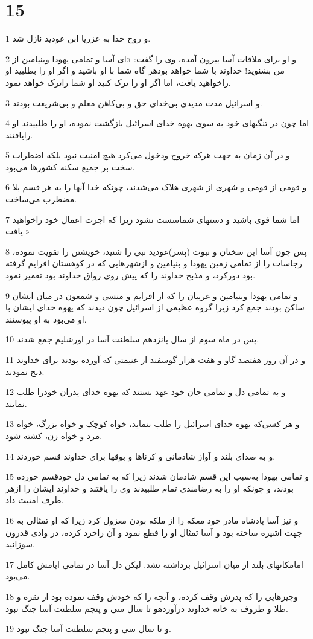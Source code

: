 \chapter{15}

\par 1 و روح خدا به عزریا ابن عودید نازل شد.
\par 2 و او برای ملاقات آسا بیرون آمده، وی را گفت: «ای آسا و تمامی یهودا وبنیامین از من بشنوید! خداوند با شما خواهد بودهر گاه شما با او باشید و اگر او را بطلبید او راخواهید یافت، اما اگر او را ترک کنید او شما راترک خواهد نمود.
\par 3 و اسرائیل مدت مدیدی بی‌خدای حق و بی‌کاهن معلم و بی‌شریعت بودند.
\par 4 اما چون در تنگیهای خود به سوی یهوه خدای اسرائیل بازگشت نموده، او را طلبیدند او رایافتند.
\par 5 و در آن زمان به جهت هر‌که خروج ودخول می‌کرد هیچ امنیت نبود بلکه اضطراب سخت بر جمیع سکنه کشورها می‌بود.
\par 6 و قومی از قومی و شهری از شهری هلاک می‌شدند، چونکه خدا آنها را به هر قسم بلا مضطرب می‌ساخت.
\par 7 اما شما قوی باشید و دستهای شماسست نشود زیرا که اجرت اعمال خود راخواهید یافت.»
\par 8 پس چون آسا این سخنان و نبوت (پسر)عودید نبی را شنید، خویشتن را تقویت نموده، رجاسات را از تمامی زمین یهودا و بنیامین و ازشهرهایی که در کوهستان افرایم گرفته بود دورکرد، و مذبح خداوند را که پیش روی رواق خداوند بود تعمیر نمود.
\par 9 و تمامی یهودا وبنیامین و غریبان را که از افرایم و منسی و شمعون در میان ایشان ساکن بودند جمع کرد زیرا گروه عظیمی از اسرائیل چون دیدند که یهوه خدای ایشان با او می‌بود به او پیوستند.
\par 10 پس در ماه سوم از سال پانزدهم سلطنت آسا در اورشلیم جمع شدند.
\par 11 و در آن روز هفتصد گاو و هفت هزار گوسفند از غنیمتی که آورده بودند برای خداوند ذبح نمودند.
\par 12 و به تمامی دل و تمامی جان خود عهد بستند که یهوه خدای پدران خودرا طلب نمایند.
\par 13 و هر کسی‌که یهوه خدای اسرائیل را طلب ننماید، خواه کوچک و خواه بزرگ، خواه مرد و خواه زن، کشته شود.
\par 14 و به صدای بلند و آواز شادمانی و کرناها و بوقها برای خداوند قسم خوردند.
\par 15 و تمامی یهودا به‌سبب این قسم شادمان شدند زیرا که به تمامی دل خودقسم خورده بودند، و چونکه او را به رضامندی تمام طلبیدند وی را یافتند و خداوند ایشان را ازهر طرف امنیت داد.
\par 16 و نیز آسا پادشاه مادر خود معکه را از ملکه بودن معزول کرد زیرا که او تمثالی به جهت اشیره ساخته بود و آسا تمثال او را قطع نمود و آن راخرد کرده، در وادی قدرون سوزانید.
\par 17 امامکانهای بلند از میان اسرائیل برداشته نشد. لیکن دل آسا در تمامی ایامش کامل می‌بود.
\par 18 وچیزهایی را که پدرش وقف کرده، و آنچه را که خودش وقف نموده بود از نقره و طلا و ظروف به خانه خداوند درآوردهو تا سال سی و پنجم سلطنت آسا جنگ نبود.
\par 19 و تا سال سی و پنجم سلطنت آسا جنگ نبود.
 
